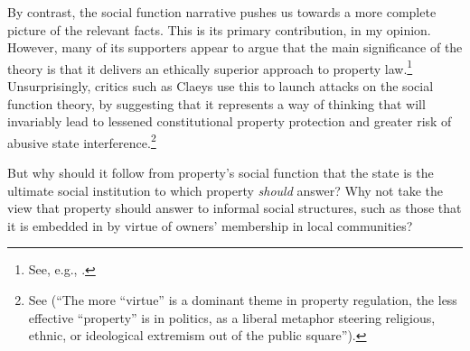By contrast, the social function narrative pushes us towards a more complete picture of the relevant facts. This is its primary contribution, in my opinion. However, many of its supporters appear to argue that the main significance of the theory is that it delivers an ethically superior approach to property law.\footnote{See, e.g., \cite{penalver09}.} Unsurprisingly, critics such as Claeys use this to launch attacks on the social function theory, by suggesting that it represents a way of thinking that will invariably lead to lessened constitutional property protection and greater risk of abusive state interference.\footnote{See \cite{claeys09} (``The more ``virtue'' is a dominant theme in property regulation, the less effective ``property'' is in politics, as a liberal metaphor steering religious, ethnic, or ideological extremism out of the public square'').} %


But why should it follow from property's social function that the state is the ultimate social institution to which property {\it should} answer? Why not take the view that property should answer to informal social structures, such as those that it is embedded in by virtue of owners' membership in local communities?

